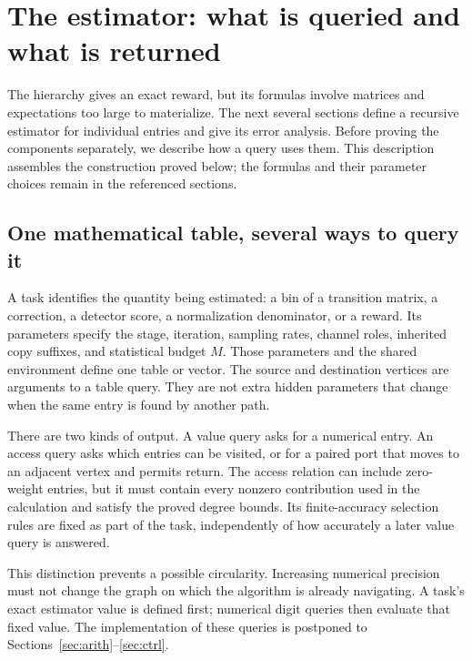 \section{The estimator: what is queried and what is returned}
\label{sec:estimator-description}

The hierarchy gives an exact reward, but its formulas involve matrices and expectations too large to materialize. The next several sections define a recursive estimator for individual entries and give its error analysis. Before proving the components separately, we describe how a query uses them. This description assembles the construction proved below; the formulas and their parameter choices remain in the referenced sections.

\subsection{One mathematical table, several ways to query it}

A task identifies the quantity being estimated: a bin of a transition matrix, a correction, a detector score, a normalization denominator, or a reward. Its parameters specify the stage, iteration, sampling rates, channel roles, inherited copy suffixes, and statistical budget $M$. Those parameters and the shared environment define one table or vector. The source and destination vertices are arguments to a table query. They are not extra hidden parameters that change when the same entry is found by another path.

There are two kinds of output. A value query asks for a numerical entry. An access query asks which entries can be visited, or for a paired port that moves to an adjacent vertex and permits return. The access relation can include zero-weight entries, but it must contain every nonzero contribution used in the calculation and satisfy the proved degree bounds. Its finite-accuracy selection rules are fixed as part of the task, independently of how accurately a later value query is answered.

This distinction prevents a possible circularity. Increasing numerical precision must not change the graph on which the algorithm is already navigating. A task's exact estimator value is defined first; numerical digit queries then evaluate that fixed value. The implementation of these queries is postponed to Sections~\ref{sec:arith}--\ref{sec:ctrl}.

